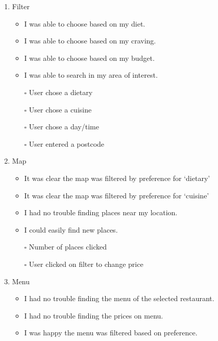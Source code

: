 \documentclass[a4 paper, 10pt]{article}
\begin{document}
    \begin{multicols}{2}
        \renewcommand{\labelitemi}{$\blacksquare$}
        \begin{enumerate}
            \item Filter
                \begin{itemize}
                    \item I was able to choose based on my diet.
                    \item I was able to choose based on my craving.
                    \item I was able to choose based on my budget.
                    \item I was able to search in my area of interest.
                    \item[$\square$] User chose a dietary
                    \item[$\square$] User chose a cuisine
                    \item[$\square$] User chose a day/time
                    \item[$\square$] User entered a postcode
                \end{itemize}
            \item Map
                \begin{itemize}
                    \item It was clear the map was filtered by preference for ‘dietary’
                    \item It was clear the map was filtered by preference for ‘cuisine’
                    \item I had no trouble finding places near my location. 
                    \item I could easily find new places.
                    \item[$\square$] Number of places clicked
                    \item[$\square$] User clicked on filter to change price
                \end{itemize}
            \item Menu
                \begin{itemize}
                    \item I had no trouble finding the menu of the selected restaurant.
                    \item I had no trouble finding the prices on menu.
                    \item I was happy the menu was filtered based on preference.

\end{itemize}
\end{enumerate}
\end{multicols}
\end{document}
